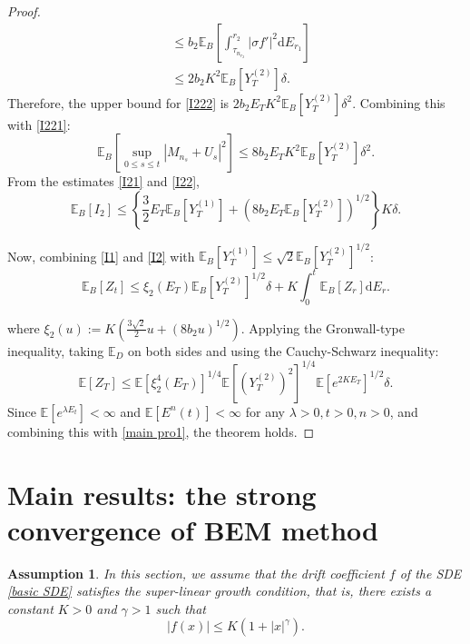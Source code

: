 \documentclass[10pt,reqno,final]{amsart}
\theoremstyle{plain}
\newtheorem{assumption}{Assumption}[section]
\theoremstyle{definition}
\theoremstyle{remark}
\numberwithin{equation}{section}
\numberwithin{figure}{section}
\numberwithin{table}{section}
\begin{document}
\begin{proof}
\begin{align*}
	&\leq b_2\mathbb{E}_B\left[\int_{\tau_{n_{r_2}}}^{r_2}\left|\sigma f'\right|^2\mathrm{d}E_{r_1}\right]\\
	&\leq 2b_2K^2\mathbb{E}_B[Y_T^{(2)}]\delta.
\end{align*}
Therefore, the upper bound for \cref{I222} is $2b_2E_TK^2\mathbb{E}_B[Y_T^{(2)}]\delta^2.$ Combining this with \cref{I221}:
\begin{equation}\label{I22}
	\mathbb{E}_B\left[\sup_{0\leq s\leq t}|M_{n_s}+U_s|^2\right] 
	\leq 8b_2E_TK^2\mathbb{E}_B[Y_T^{(2)}]\delta^2. 
\end{equation}
From the estimates \cref{I21} and \cref{I22},
\begin{equation}\label{I2}
	\mathbb{E}_B[I_2] 
	\leq \left\{\frac{3}{2}E_T\mathbb{E}_B[Y_T^{(1)}]+(8b_2E_T\mathbb{E}_B[Y_T^{(2)}])^{1/2}\right\}K\delta. 
\end{equation}

Now, combining \cref{I1} and \cref{I2} with $\mathbb{E}_B[Y_T^{(1)}]\leq\sqrt{2}\mathbb{E}_B[Y_T^{(2)}]^{1/2}$:
\begin{equation*}
	\mathbb{E}_B[Z_t] 
	\leq \xi_2(E_T)\mathbb{E}_B[Y_T^{(2)}]^{1/2}\delta + K\int_0^t\mathbb{E}_B[Z_r] \mathrm{d}E_r.
\end{equation*}

where $\xi_2(u) := K(\frac{3\sqrt{2}}{2}u + (8b_2u)^{1/2}).$
Applying the Gronwall-type inequality, taking $\mathbb{E}_D$ on both sides and using the Cauchy-Schwarz inequality:
\begin{equation*}
	\mathbb{E}[Z_T] \leq \mathbb{E}[\xi_2^4(E_T)]^{1/4}\mathbb{E}[(Y_T^{(2)})^2]^{1/4}\mathbb{E}[e^{2KE_T}]^{1/2}\delta.
\end{equation*}
Since $\mathbb{E}[e^{\lambda E_t}] < \infty$ and $\mathbb{E}[E^n(t)] < \infty$ for any $\lambda>0, t>0,n>0$, and combining this with \cref{main pro1}, the theorem holds.

\end{proof}

\section{Main results: the strong convergence of BEM method}

\begin{assumption}\label{super linear growth}
	In this section, we assume that the drift coefficient \(f\) of the SDE \cref{basic SDE} satisfies the super-linear growth condition, that is, there exists a constant \(K > 0\) and \(\gamma > 1\) such that
	\begin{equation}
		|f(x)| \le K(1+|x|^{\gamma}).
	\end{equation}
\end{assumption}
\end{document}
